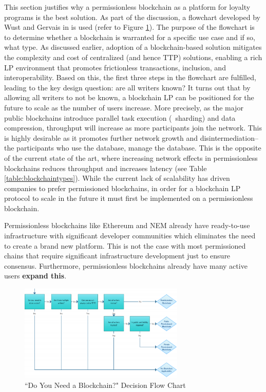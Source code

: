 This section justifies why a permissionless blockchain as a platform for loyalty programs is the best solution. As part of the discussion, a flowchart developed by Wust and Gervais in \cite{} is used (refer to Figure \ref{fig:decisionchart}). The purpose of the flowchart is to determine whether a blockchain is warranted for a specific use case and if so, what type. As discussed earlier, adoption of a blockchain-based solution mitigates the complexity and cost of centralized (and hence TTP) solutions, enabling a rich LP environment that promotes frictionless transactions, inclusion, and interoperability. Based on this, the first three steps in the flowchart are fulfilled, leading to the key design question: are all writers known? It turns out that by allowing all writers to not be known, a blockchain LP can be positioned for the future to scale as the number of users increase. More precisely, as the major public blockchains introduce parallel task execution (\ie\ sharding) and data compression, throughput will increase as more participants join the network. This is highly desirable as it promotes further network growth and disintermediation-- the participants who use the database, manage the database. This is the opposite of the current state of the art, where increasing network effects in permissionless blockchains reduces throughput and increases latency (see Table \ref{table:blockchaintypes}). While the current lack of scalability has driven companies to prefer permissioned blockchains, in order for a blockchain LP protocol to scale in the future it must first be implemented on a permissionless blockchain. 

Permissionless blockchains like Ethereum and NEM already have ready-to-use infrastructure with significant developer communities which eliminates the need to create a brand new platform.  This is not the case with most permissioned chains that require significant infrastructure development just to ensure consensus. Furthermore, permissionless blockchains already have many active users \textbf{expand this}.
%
\begin{figure}[t!] %
    \centering
        \includegraphics[keepaspectratio, width=0.7\textwidth]{images/decisionchart.png}
    \caption{``Do You Need a Blockchain?" Decision Flow Chart} \label{fig:decisionchart}
\end{figure}

